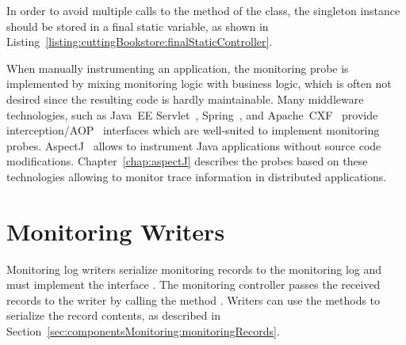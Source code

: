 

\noindent In order to avoid multiple calls to the  method of the %
 class, the singleton instance should be stored %
in a final static variable, as shown in Listing~\ref{listing:cuttingBookstore:finalStaticController}.



\noindent When manually instrumenting an application, the monitoring probe is implemented %
by mixing monitoring logic with business logic, which is often not desired since %
the resulting code is hardly maintainable. %
Many middleware technologies, such as Java~EE Servlet~\cite{JavaServletTechnology-WebSite}, %
Spring~\cite{Spring-WebSite}, and %
Apache~CXF~\cite{CXF-WebSite} provide interception/AOP~\cite{Kiczales1997} interfaces %
which are well-suited to implement monitoring probes. AspectJ~\cite{AspectJ-WebSite} allows to %
instrument Java applications without source code modifications. %
Chapter~\ref{chap:aspectJ} describes the \Kieker{} probes based on these technologies allowing to %
monitor trace information in distributed applications. 

\section{Monitoring Writers}\label{sec:monitoring-log-writers}

Monitoring log writers serialize monitoring records to the monitoring log and  %
must implement the interface . The monitoring %
controller passes the received records to the writer by calling the method %
. Writers can use the methods to serialize the %
record contents, as described in Section~\ref{sec:componentsMonitoring:monitoringRecords}. 

